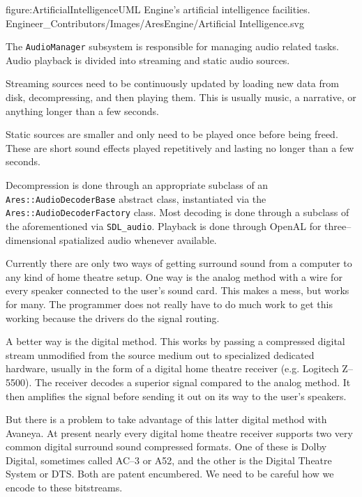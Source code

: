 \FullPageDiagram
    {figure:ArtificialIntelligenceUML}
    {Engine's artificial intelligence facilities.}
    {Engineer_Contributors/Images/AresEngine/Artificial Intelligence.svg}

\page
{}
The {\tt AudioManager} subsystem is responsible for managing audio related tasks. Audio playback is divided into streaming and static audio sources.

Streaming sources need to be continuously updated by loading new data from disk, decompressing, and then playing them. This is usually music, a narrative, or anything longer than a few seconds.

Static sources are smaller and only need to be played once before being freed. These are short sound effects played repetitively and lasting no longer than a few seconds.

Decompression is done through an appropriate subclass of an {\tt Ares::AudioDecoderBase} abstract class, instantiated via the {\tt Ares::AudioDecoderFactory} class. Most decoding is done through a subclass of the aforementioned via {\tt SDL_audio}. Playback is done through OpenAL for three--dimensional spatialized audio whenever available.

Currently there are only two ways of getting surround sound from a computer to any kind of home theatre setup. One way is the analog method with a wire for every speaker connected to the user's sound card. This makes a mess, but works for many. The programmer does not really have to do much work to get this working because the drivers do the signal routing.

A better way is the digital method. This works by passing a compressed digital stream unmodified from the source medium out to specialized dedicated hardware, usually in the form of a digital home theatre receiver (e.g. Logitech Z--5500). The receiver decodes a superior signal compared to the analog method. It then amplifies the signal before sending it out on its way to the user's speakers. 

But there is a problem to take advantage of this latter digital method with Avaneya. At present nearly every digital home theatre receiver supports two very common digital surround sound compressed formats. One of these is Dolby Digital, sometimes called AC--3 or A52, and the other is the Digital Theatre System or DTS. Both are patent encumbered. We need to be careful how we encode to these bitstreams. 

